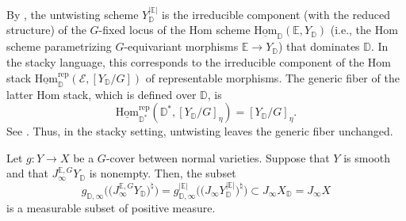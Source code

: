 \documentclass[12pt]{amsart}
\theoremstyle{plain}   %
\theoremstyle{definition}    %
\theoremstyle{remark}    %
\numberwithin{equation}{theorem}
\newcommand{\sE}{\mathcal{E}}
\newcommand{\bD}{\mathbb{D}}
\newcommand{\bE}{\mathbb{E}}
\begin{document}
\begin{remark}
By \cite[\S6.3 and Remark 14.5]{YasudaMotivicIntegrationDeligneMumfordStack}, the untwisting scheme $Y_\bD^{|\bE|}$ is the irreducible component (with the reduced structure) of the $G$-fixed locus of the Hom scheme $\underline{\mathrm{Hom}}_\bD(\bE,Y_\bD)$ (i.e., the Hom scheme parametrizing $G$-equivariant morphisms $\bE\to Y_\bD$) that dominates $\bD$.
In the stacky language, this corresponds to the irreducible component of the Hom stack $\underline{\mathrm{Hom}}^{\mathrm{rep}}_\bD(\sE,[Y_\bD /G])$ of representable morphisms. The generic fiber of the latter Hom stack, which is defined over $\bD$,  is \[
\underline{\mathrm{Hom}}^{\mathrm{rep}}_{\bD^*}(\bD^*,[Y_\bD /G]_\eta)
=[Y_\bD /G]_\eta. 
\]
See \cite[Remark 6.23]{YasudaPcyclicMackayCorrespondenceMotivicIntegration}. Thus, in the stacky setting, untwisting leaves the generic fiber unchanged. 
\end{remark}


\begin{lemma} \label{lem.PositiveMeasureLemma}
Let $g\colon Y\to X$ be a $G$-cover between normal varieties. Suppose that $Y$ is smooth and that $J_\infty^{\bE,G}Y_\bD$ is nonempty. Then, the subset
\[
g_{\bD,\infty} \Big(\big(J_\infty^{\bE,G}Y_\bD\big)^\natural\Big)=g_{\bD,\infty}^{|\bE|} \Big(\big(J_\infty Y_\bD^{|\bE|}\big)^\natural\Big)
\subset J_\infty X_\bD = J_\infty X
\]
is a measurable subset of positive measure.
\end{lemma}
\end{document}
